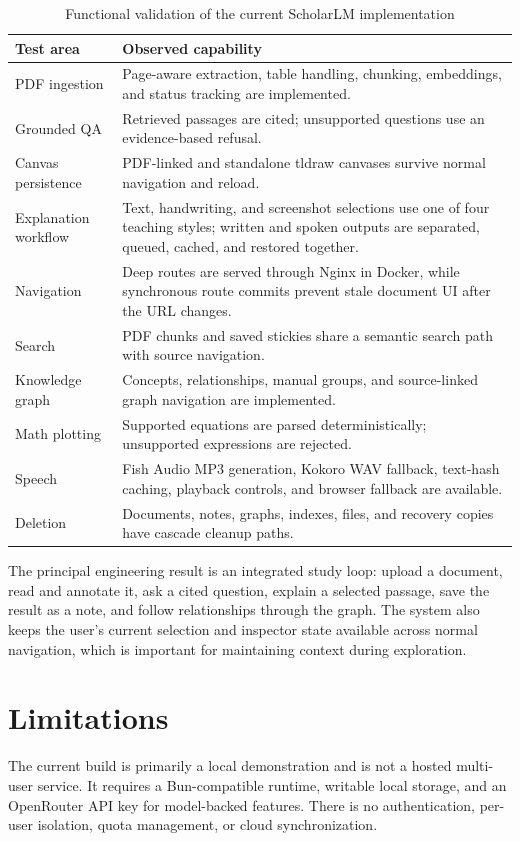 \documentclass[conference]{IEEEtran}
\begin{document}
\begin{table}[t]
\caption{Functional validation of the current ScholarLM implementation}
\label{tab:validation}
\centering
\scriptsize
\begin{tabular}{p{} p{}}
\toprule
\textbf{Test area} & \textbf{Observed capability}\\
\midrule
PDF ingestion & Page-aware extraction, table handling, chunking, embeddings, and status tracking are implemented.\\
Grounded QA & Retrieved passages are cited; unsupported questions use an evidence-based refusal.\\
Canvas persistence & PDF-linked and standalone tldraw canvases survive normal navigation and reload.\\
Explanation workflow & Text, handwriting, and screenshot selections use one of four teaching styles; written and spoken outputs are separated, queued, cached, and restored together.\\
Navigation & Deep routes are served through Nginx in Docker, while synchronous route commits prevent stale document UI after the URL changes.\\
Search & PDF chunks and saved stickies share a semantic search path with source navigation.\\
Knowledge graph & Concepts, relationships, manual groups, and source-linked graph navigation are implemented.\\
Math plotting & Supported equations are parsed deterministically; unsupported expressions are rejected.\\
Speech & Fish Audio MP3 generation, Kokoro WAV fallback, text-hash caching, playback controls, and browser fallback are available.\\
Deletion & Documents, notes, graphs, indexes, files, and recovery copies have cascade cleanup paths.\\
\bottomrule
\end{tabular}
\end{table}

The principal engineering result is an integrated study loop: upload a document, read and annotate it, ask a cited question, explain a selected passage, save the result as a note, and follow relationships through the graph. The system also keeps the user's current selection and inspector state available across normal navigation, which is important for maintaining context during exploration.

\section{Limitations}
The current build is primarily a local demonstration and is not a hosted multi-user service. It requires a Bun-compatible runtime, writable local storage, and an OpenRouter API key for model-backed features. There is no authentication, per-user isolation, quota management, or cloud synchronization.
\end{document}
